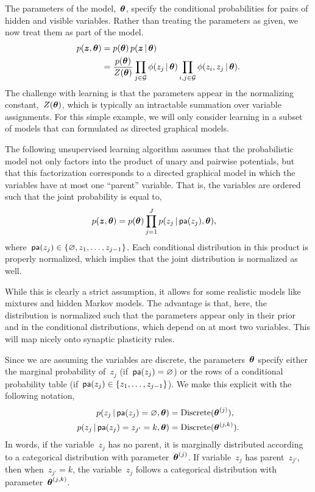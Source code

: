 The parameters of the model,~$\boldsymbol{\theta}$, specify the conditional
probabilities for pairs of hidden and visible variables. Rather than
treating the parameters as given, we now treat them as part of the
model.
\begin{align*}
  p(\boldsymbol{z}, \boldsymbol{\theta}) &= p(\boldsymbol{\theta}) \, p(\boldsymbol{z} \,|\, \boldsymbol{\theta})  \\
  &= \frac{p(\boldsymbol{\theta})}{Z(\boldsymbol{\theta})} \prod_{j \in \mathcal{G}} \phi(z_j \,|\, \boldsymbol{\theta})
  \prod_{i,j \in \mathcal{G}} \phi(z_i, z_{j} \,|\, \boldsymbol{\theta}).
\end{align*}
The challenge with learning is that the parameters appear in the
normalizing constant,~$Z(\boldsymbol{\theta})$, which is typically an intractable
summation over variable assignments. For this simple example,
we will only consider learning in a subset of models that can
formulated as directed graphical models.

\begin{assumption}
  The following unsupervised learning algorithm assumes that the probabilistic
  model not only factors into the product of unary and pairwise
  potentials, but that this factorization corresponds to a directed
  graphical model in which the variables have at most one ``parent''
  variable. That is, the variables are ordered such that the
  joint probability is equal to,
  \begin{align*}
    p(\boldsymbol{z}, \boldsymbol{\theta}) &= p(\boldsymbol{\theta}) \prod_{j=1}^J p(z_j \,|\, \mathsf{pa}(z_j), \boldsymbol{\theta}),
  \end{align*}
  where~$\mathsf{pa}(z_j) \in \{\varnothing, z_1, \ldots, z_{j-1}\}$.
  Each conditional distribution in this product is properly normalized,
  which implies that the joint distribution is normalized as well.
\end{assumption}

While this is clearly a strict assumption, it allows
for some realistic models like mixtures and hidden Markov models.
The advantage is that, here, the
distribution is normalized such that the parameters appear only
in their prior and in the conditional distributions, which depend
on at most two variables. This will map nicely onto synaptic plasticity
rules. 

Since we are assuming the variables
are discrete, the parameters~$\boldsymbol{\theta}$ specify either the marginal
probability of~$z_j$ (if~$\mathsf{pa}(z_j)=\varnothing$) or the rows of a
conditional probability table (if~${\mathsf{pa}(z_j) \in \{z_1, \ldots, z_{j-1}\}}$).
We
make this explicit with the following notation,
\begin{align*}
  p(z_j \,|\, \mathsf{pa}(z_j)=\varnothing, \boldsymbol{\theta}) &= \mathrm{Discrete}(\boldsymbol{\theta}^{(j)}), \\
  p(z_j \,|\, \mathsf{pa}(z_{j})=z_{j'}=k, \boldsymbol{\theta}) &=  \mathrm{Discrete}(\boldsymbol{\theta}^{(j,k)}).
\end{align*}
In words, if the variable~$z_j$ has no parent, it is marginally distributed
according to a categorical distribution with parameter~$\boldsymbol{\theta}^{(j)}$.
If variable~$z_j$ has parent~$z_{j'}$, then when~$z_{j'}=k$, the
variable~$z_j$ follows a categorical distribution with
parameter~$\boldsymbol{\theta}^{(j,k)}$. 

